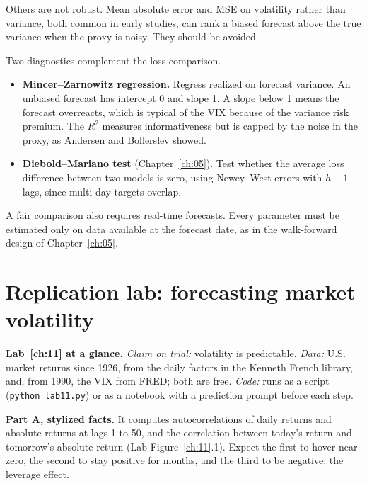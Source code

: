 Others are not robust. Mean absolute error and MSE on volatility rather than variance, both common in early studies, can rank a biased forecast above the true variance when the proxy is noisy. They should be avoided.

Two diagnostics complement the loss comparison.

\begin{itemize}
  \item \textbf{Mincer--Zarnowitz regression.} Regress realized on forecast variance. An unbiased forecast has intercept 0 and slope 1. A slope below 1 means the forecast overreacts, which is typical of the VIX because of the variance risk premium. The $R^2$ measures informativeness but is capped by the noise in the proxy, as Andersen and Bollerslev showed.
  \item \textbf{Diebold--Mariano test} (Chapter~\ref{ch:05}). Test whether the average loss difference between two models is zero, using Newey--West errors with $h - 1$ lags, since multi-day targets overlap.
\end{itemize}

A fair comparison also requires real-time forecasts. Every parameter must be estimated only on data available at the forecast date, as in the walk-forward design of Chapter~\ref{ch:05}.

\section{Replication lab: forecasting market volatility}
\label{sec:11-lab}

\begin{callout}
\textbf{Lab~\ref{ch:11} at a glance.} \emph{Claim on trial:} volatility is predictable. \emph{Data:} U.S. market returns since 1926, from the daily factors in the Kenneth French library, and, from 1990, the VIX from FRED; both are free. \emph{Code:} runs as a script (\texttt{python lab11.py}) or as a notebook with a prediction prompt before each step.
\end{callout}

\textbf{Part A, stylized facts.} It computes autocorrelations of daily returns and absolute returns at lags 1 to 50, and the correlation between today's return and tomorrow's absolute return (Lab Figure~\ref{ch:11}.1). Expect the first to hover near zero, the second to stay positive for months, and the third to be negative: the leverage effect.

